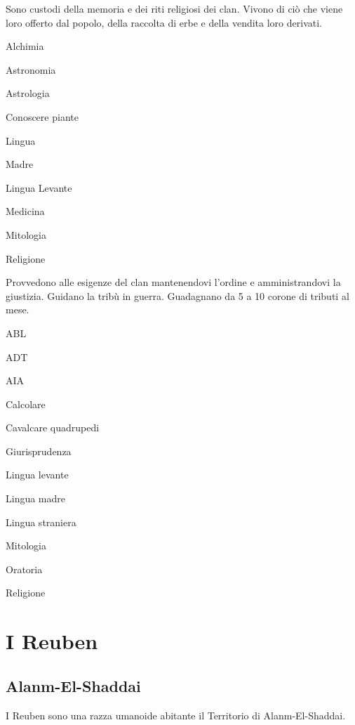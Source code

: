 
Sono custodi della memoria e dei riti religiosi dei clan. Vivono di
ci\`o che viene loro offerto dal popolo, della raccolta di erbe e
della vendita loro derivati.

\begin{abilist}
\item Alchimia
\item Astronomia
\item Astrologia
\item Conoscere piante
\item Lingua
\item Madre
\item Lingua Levante
\item Medicina
\item Mitologia
\item Religione
\end{abilist}


Provvedono alle esigenze
del clan mantenendovi l'ordine e amministrandovi la giustizia. Guidano la trib\`u
in guerra. Guadagnano da 5 a 10 corone di tributi al mese.

\begin{abilist}
\item ABL
\item ADT
\item AIA
\item Calcolare
\item Cavalcare quadrupedi
\item Giurisprudenza
\item Lingua levante
\item Lingua madre
\item Lingua straniera
\item Mitologia
\item Oratoria
\item Religione
\end{abilist}
\vskip 1cm
\section{I Reuben}

\subsection{Alanm-El-Shaddai}
\vskip 1cm
\vskip 1cm
I Reuben sono una razza umanoide abitante il Territorio di Alanm-El-Shaddai.

